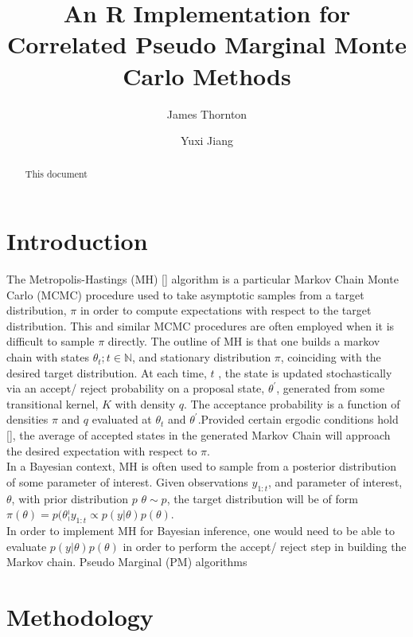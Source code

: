 \documentclass{article}
\title{An R Implementation for Correlated Pseudo Marginal Monte Carlo Methods}
\author{James Thornton \and Yuxi Jiang}
\begin{document}



  \maketitle

  \begin{abstract}
  This document
  \end{abstract}

  \section{Introduction}

  The Metropolis-Hastings (MH) [] algorithm is a particular Markov Chain Monte Carlo (MCMC) procedure used to take asymptotic samples from a target distribution, $\pi$ in order to compute expectations with respect to the target distribution. This and similar MCMC procedures are often employed when it is difficult to sample $ \pi$ directly. The outline of MH is that one builds a markov chain with states $ \theta_t; t \in \mathbb{N}$, and stationary distribution $\pi$, coinciding with the desired target distribution. At each time, $ t $ , the state is updated stochastically via an accept/ reject probability on a proposal state, $\theta^\prime$, generated from some transitional kernel, $K$ with density $q$. The acceptance probability is a function of densities  $\pi$ and $q$ evaluated at $\theta_t$ and $\theta^\prime$.Provided certain ergodic conditions hold [], the average of accepted states in the generated Markov Chain will approach the desired expectation with respect to $\pi$. \\

In a Bayesian context, MH is often used to sample from a posterior distribution of some parameter of interest. Given observations $y_{1:t}$, and parameter of interest, $\theta$, with prior distribution $p$ $\theta \sim p$, the target distribution will be of form $\pi (\theta) = p (\theta ¦ y_{1:t} \propto p(y|\theta) p(\theta)$.\\

In order to implement MH for Bayesian inference, one would need to be able to evaluate $p(y|\theta) p(\theta)$ in order to perform the accept/ reject step in building the Markov chain. Pseudo Marginal (PM) algorithms


  \section{Methodology}
\end{document}
